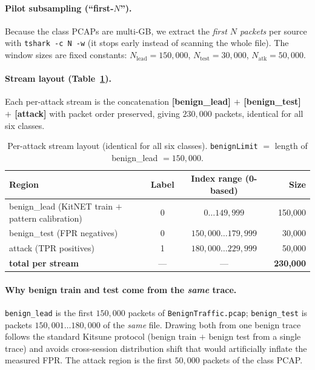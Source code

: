 \documentclass[11pt]{article}
\begin{document}
\paragraph{Pilot subsampling (``first-$N$'').} Because the class PCAPs are multi-GB, we extract the
\emph{first $N$ packets} per source with \texttt{tshark -c N -w} (it stops early instead of scanning
the whole file). The window sizes are fixed constants:
$N_{\text{lead}}=150{,}000$, $N_{\text{test}}=30{,}000$, $N_{\text{atk}}=50{,}000$.

\paragraph{Stream layout (Table~\ref{tab:layout}).} Each per-attack stream is the concatenation
\textbf{[benign\_lead] $+$ [benign\_test] $+$ [attack]} with packet order preserved, giving
$230{,}000$ packets, identical for all six classes.

\begin{table}[t]
\centering
\caption{Per-attack stream layout (identical for all six classes). \texttt{benignLimit} $=$ length
of benign\_lead $= 150{,}000$.}
\label{tab:layout}
\small
\begin{tabular}{lccr}
\toprule
\textbf{Region} & \textbf{Label} & \textbf{Index range (0-based)} & \textbf{Size} \\
\midrule
benign\_lead (KitNET train $+$ pattern calibration) & 0 & $0 \ldots 149{,}999$     & 150{,}000 \\
benign\_test (FPR negatives)                        & 0 & $150{,}000 \ldots 179{,}999$ & 30{,}000 \\
attack (TPR positives)                              & 1 & $180{,}000 \ldots 229{,}999$ & 50{,}000 \\
\midrule
\textbf{total per stream} & --- & --- & \textbf{230{,}000} \\
\bottomrule
\end{tabular}
\end{table}

\paragraph{Why benign train and test come from the \emph{same} trace.} \texttt{benign\_lead} is the
first $150{,}000$ packets of \texttt{BenignTraffic.pcap}; \texttt{benign\_test} is packets
$150{,}001 \ldots 180{,}000$ of the \emph{same} file. Drawing both from one benign trace follows the
standard Kitsune protocol (benign train $+$ benign test from a single trace) and avoids cross-session
distribution shift that would artificially inflate the measured FPR. The attack region is the first
$50{,}000$ packets of the class PCAP.
\end{document}
